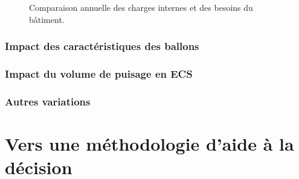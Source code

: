 \begin{figure}
    \begin{center}
    \end{center}
    \caption{Comparaison annuelle des charges internes et des besoins du bâtiment.
             \label{fig:comp_charge_besoins}}
\end{figure}



\subsubsection{Impact des caractéristiques des ballons} %
\label{ssub:impact_des_caracteristiques_des_ballons}



\subsubsection{Impact du volume de puisage en ECS} %
\label{ssub:impact_du_volume_de_puisage_en_ecs}



\subsubsection{Autres variations} %
\label{ssub:autres_variations}







\section{Vers une méthodologie d’aide à la décision} %
\label{sec:vers_une_methodologie_d_aide_a_la_decision}

